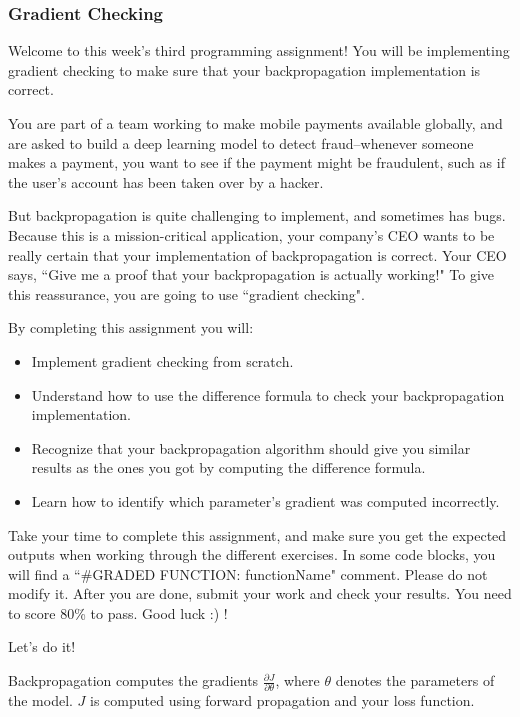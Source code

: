 \subsubsection{Gradient Checking}

Welcome to this week's third programming assignment! You will be implementing gradient checking to make sure that your backpropagation implementation is correct.

You are part of a team working to make mobile payments available globally, and are asked to build a deep learning model to detect fraud--whenever someone makes a payment, you want to see if the payment might be fraudulent, such as if the user's account has been taken over by a hacker.

But backpropagation is quite challenging to implement, and sometimes has bugs. Because this is a mission-critical application, your company's CEO wants to be really certain that your implementation of backpropagation is correct. Your CEO says, ``Give me a proof that your backpropagation is actually working!" To give this reassurance, you are going to use ``gradient checking".


By completing this assignment you will:
\begin{itemize}
\item Implement gradient checking from scratch.
\item Understand how to use the difference formula to check your backpropagation implementation.
\item Recognize that your backpropagation algorithm should give you similar results as the ones you got by computing the difference formula.
\item Learn how to identify which parameter's gradient was computed incorrectly.
\end{itemize}

Take your time to complete this assignment, and make sure you get the expected outputs when working through the different exercises. In some code blocks, you will find a ``\#GRADED FUNCTION: functionName" comment. Please do not modify it. After you are done, submit your work and check your results. You need to score 80\% to pass. Good luck :) !

Let's do it!


\label{sec:1}

Backpropagation computes the gradients $\frac{\partial J}{\partial \theta}$, where $\theta$ denotes the parameters of the model. $J$ is computed using forward propagation and your loss function.

